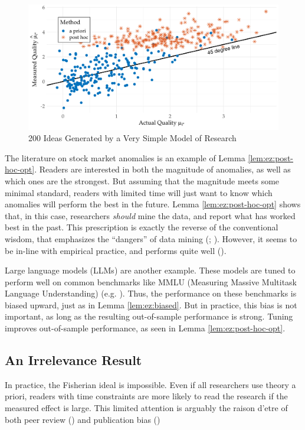 \documentclass[12pt,english]{article}
\theoremstyle{plain}
\theoremstyle{plain}
\begin{document}
\begin{figure}[htbp]
    \centering
    \includegraphics[width=\textwidth]{simple-scatter.pdf}
    \caption{200 Ideas Generated by a Very Simple Model of Research}
    \label{fig:ez}
\end{figure}


The literature on stock market anomalies is an example of Lemma \ref{lem:ez:post-hoc-opt}. Readers are interested in both the magnitude of anomalies, as well as which ones are the strongest.  But assuming that the magnitude meets some minimal standard, readers with limited time will just want to know which anomalies will perform the best in the future. Lemma \ref{lem:ez:post-hoc-opt} shows that, in this case, researchers \emph{should} mine the data, and report what has worked best in the past. This prescription is exactly the reverse of the conventional wisdom, that emphasizes the ``dangers'' of data mining (\citealt{sullivan1999data}; \citealt{harvey2016and}). However, it seems to be in-line with empirical practice, and performs quite well (\citealt{chen2024does}).

Large language models (LLMs) are another example. These models are tuned to perform well on common benchmarks like MMLU (Measuring Massive Multitask Language Understanding) (e.g. \citet{guo2025deepseek}). Thus, the performance on these benchmarks is biased upward, just as in Lemma \ref{lem:ez:biased}. But in practice, this bias is not important, as long as the resulting out-of-sample performance is strong. Tuning improves out-of-sample performance, as seen in Lemma \ref{lem:ez:post-hoc-opt}. 

\subsection{An Irrelevance Result}\label{sec:ez:irr}

In practice, the Fisherian ideal is impossible. Even if all researchers use theory a priori, readers with time constraints are more likely to read the research if the measured effect is large.  This limited attention is arguably the raison d'etre of both peer review (\citet{klamer2002attention}) and publication bias (\citet{chen2022publication})
\end{document}
